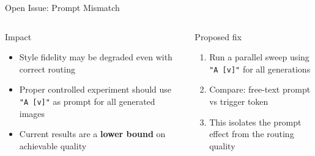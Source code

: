 \documentclass[aspectratio=169,10pt]{beamer}
\begin{document}
\begin{frame}[shrink=15]{Open Issue: Prompt Mismatch}
\begin{columns}[T]
      \begin{alertblock}{Impact}
        \begin{itemize}
          \item Style fidelity may be degraded even with correct routing
          \item Proper controlled experiment should use \texttt{"A [v]"} as prompt for all generated images
          \item Current results are a \textbf{lower bound} on achievable quality
        \end{itemize}
      \end{alertblock}
      \begin{exampleblock}{Proposed fix}
        \begin{enumerate}
          \footnotesize
          \item Run a parallel sweep using \texttt{"A [v]"} for all generations
          \item Compare: free-text prompt vs trigger token
          \item This isolates the prompt effect from the routing quality
        \end{enumerate}
      \end{exampleblock}
  \end{columns}
\end{frame}
\end{document}
